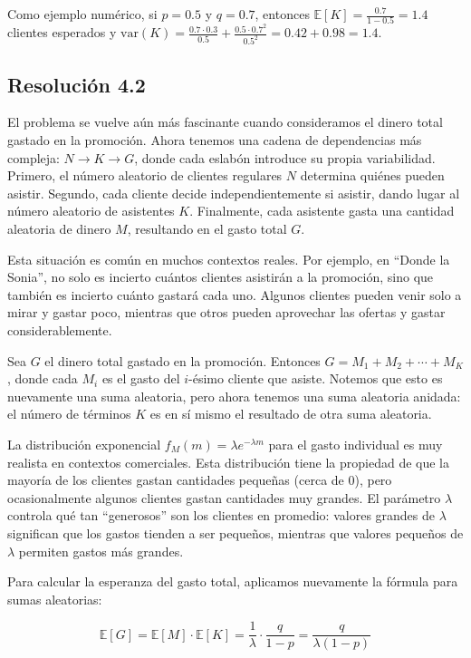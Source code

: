\documentclass[
  11pt,
  letterpaper,
   addpoints,
  answers
  ]{exam}
\begin{document}
\begin{questions}
\begin{solution}
Como ejemplo numérico, si $p = 0.5$ y $q = 0.7$, entonces $\mathbb{E}[K] = \frac{0.7}{1-0.5} = 1.4$ clientes esperados y $\text{var}(K) = \frac{0.7 \cdot 0.3}{0.5} + \frac{0.5 \cdot 0.7^2}{0.5^2} = 0.42 + 0.98 = 1.4$.

\subsection*{Resolución 4.2}

El problema se vuelve aún más fascinante cuando consideramos el dinero total gastado en la promoción. Ahora tenemos una cadena de dependencias más compleja: $N \rightarrow K \rightarrow G$, donde cada eslabón introduce su propia variabilidad. Primero, el número aleatorio de clientes regulares $N$ determina quiénes pueden asistir. Segundo, cada cliente decide independientemente si asistir, dando lugar al número aleatorio de asistentes $K$. Finalmente, cada asistente gasta una cantidad aleatoria de dinero $M$, resultando en el gasto total $G$.

Esta situación es común en muchos contextos reales. Por ejemplo, en ``Donde la Sonia'', no solo es incierto cuántos clientes asistirán a la promoción, sino que también es incierto cuánto gastará cada uno. Algunos clientes pueden venir solo a mirar y gastar poco, mientras que otros pueden aprovechar las ofertas y gastar considerablemente.

Sea $G$ el dinero total gastado en la promoción. Entonces $G = M_1 + M_2 + \cdots + M_K$, donde cada $M_i$ es el gasto del $i$-ésimo cliente que asiste. Notemos que esto es nuevamente una suma aleatoria, pero ahora tenemos una suma aleatoria anidada: el número de términos $K$ es en sí mismo el resultado de otra suma aleatoria.

La distribución exponencial $f_M(m) = \lambda e^{-\lambda m}$ para el gasto individual es muy realista en contextos comerciales. Esta distribución tiene la propiedad de que la mayoría de los clientes gastan cantidades pequeñas (cerca de $0$), pero ocasionalmente algunos clientes gastan cantidades muy grandes. El parámetro $\lambda$ controla qué tan ``generosos'' son los clientes en promedio: valores grandes de $\lambda$ significan que los gastos tienden a ser pequeños, mientras que valores pequeños de $\lambda$ permiten gastos más grandes.

Para calcular la esperanza del gasto total, aplicamos nuevamente la fórmula para sumas aleatorias:

\begin{equation}
\mathbb{E}[G] = \mathbb{E}[M] \cdot \mathbb{E}[K] = \frac{1}{\lambda} \cdot \frac{q}{1-p} = \frac{q}{\lambda(1-p)}
\end{equation}


\end{solution}
\end{questions}
\end{document}

